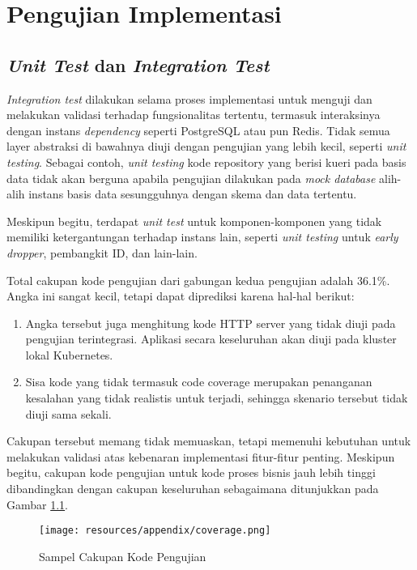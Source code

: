 \chapter{Pengujian Implementasi}
\label{apx:implementation-test}

\section{\textit{Unit Test} dan \textit{Integration Test}}

\textit{Integration test} dilakukan selama proses implementasi untuk menguji dan melakukan validasi terhadap fungsionalitas tertentu, termasuk interaksinya dengan instans \textit{dependency} seperti PostgreSQL atau pun Redis. Tidak semua layer abstraksi di bawahnya diuji dengan pengujian yang lebih kecil, seperti \textit{unit testing}. Sebagai contoh, \textit{unit testing} kode repository yang berisi kueri pada basis data tidak akan berguna apabila pengujian dilakukan pada \textit{mock database} alih-alih instans basis data sesungguhnya dengan skema dan data tertentu.

Meskipun begitu, terdapat \textit{unit test} untuk komponen-komponen yang tidak memiliki ketergantungan terhadap instans lain, seperti \textit{unit testing} untuk \textit{early dropper}, pembangkit ID, dan lain-lain.

Total cakupan kode pengujian dari gabungan kedua pengujian adalah 36.1\%. Angka ini sangat kecil, tetapi dapat diprediksi karena hal-hal berikut:

\begin{enumerate}
    \item Angka tersebut juga menghitung kode HTTP server yang tidak diuji pada pengujian terintegrasi. Aplikasi secara keseluruhan akan diuji pada kluster lokal Kubernetes.
    \item Sisa kode yang tidak termasuk code coverage merupakan penanganan kesalahan yang tidak realistis untuk terjadi, sehingga skenario tersebut tidak diuji sama sekali.
\end{enumerate}

Cakupan tersebut memang tidak memuaskan, tetapi memenuhi kebutuhan untuk melakukan validasi atas kebenaran implementasi fitur-fitur penting. Meskipun begitu, cakupan kode pengujian untuk kode proses bisnis jauh lebih tinggi dibandingkan dengan cakupan keseluruhan sebagaimana ditunjukkan pada Gambar \ref{fig:code-coverage}.

\begin{figure}[htbp]
    \centering
    \texttt{[image: resources/appendix/coverage.png]}
    \caption{Sampel Cakupan Kode Pengujian}
    \label{fig:code-coverage}
\end{figure}

